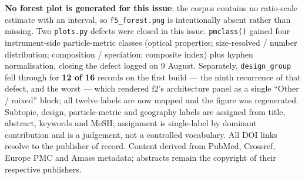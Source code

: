 \documentclass[10pt]{article}
\begin{document}
\begin{keybox}
{\textbf{No forest plot is generated for this issue}: the corpus contains no ratio-scale
estimate with an interval, so \texttt{f5\_forest.png} is intentionally absent rather than
missing.
Two \texttt{plots.py} defects were closed in this issue. \texttt{pmclass()} gained four
instrument-side particle-metric classes (optical properties; size-resolved / number
distribution; composition / speciation; composite index) plus hyphen normalisation,
closing the defect logged on 9 August. Separately, \texttt{design\_group} fell through for
\textbf{12 of 16} records on the first build --- the ninth recurrence of that defect, and
the worst --- which rendered f2's architecture panel as a single ``Other / mixed'' block;
all twelve labels are now mapped and the figure was regenerated.
Subtopic, design, particle-metric and geography labels are assigned from title, abstract,
keywords and MeSH; assignment is single-label by dominant contribution and is a
judgement, not a controlled vocabulary.
All DOI links resolve to the publisher of record. Content derived from PubMed, Crossref,
Europe PMC and Amass metadata; abstracts remain the copyright of their respective
publishers.\par}
\end{keybox}
\end{document}
